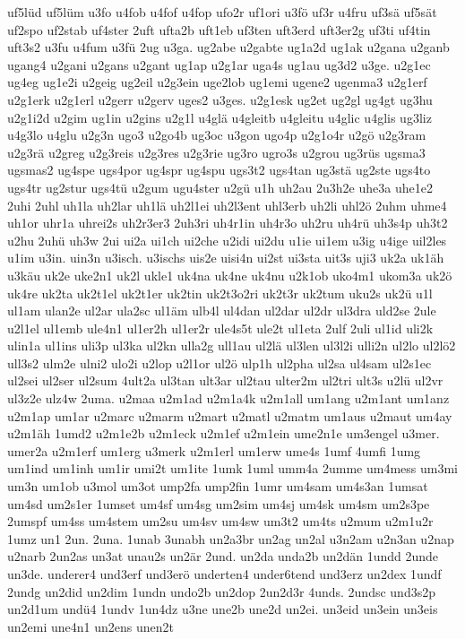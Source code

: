 {uf5lüd
uf5lüm
u3fo
u4fob
u4fof
u4fop
ufo2r
uf1ori
u3fö
uf3r
u4fru
uf3sä
uf5sät
uf2spo
uf2stab
uf4ster
2uft
ufta2b
uft1eb
uf3ten
uft3erd
uft3er2g
uf3ti
uf4tin
uft3s2
u3fu
u4fum
u3fü
2ug
u3ga.
ug2abe
u2gabte
ug1a2d
ug1ak
u2gana
u2ganb
ugang4
u2gani
u2gans
u2gant
ug1ap
u2g1ar
uga4s
ug1au
ug3d2
u3ge.
u2g1ec
ug4eg
ug1e2i
u2geig
ug2eil
u2g3ein
uge2lob
ug1emi
ugene2
ugenma3
u2g1erf
u2g1erk
u2g1erl
u2gerr
u2gerv
uges2
u3ges.
u2g1esk
ug2et
ug2gl
ug4gt
ug3hu
u2g1i2d
u2gim
ug1in
u2gins
u2g1l
u4glä
u4gleitb
u4gleitu
u4glic
u4glis
ug3liz
u4g3lo
u4glu
u2g3n
ugo3
u2go4b
ug3oc
u3gon
ugo4p
u2g1o4r
u2gö
u2g3ram
u2g3rä
u2greg
u2g3reis
u2g3res
u2g3rie
ug3ro
ugro3s
u2grou
ug3rüs
ugsma3
ugsmas2
ug4spe
ugs4por
ug4spr
ug4spu
ugs3t2
ugs4tan
ug3stä
ug2ste
ugs4to
ugs4tr
ug2stur
ugs4tü
u2gum
ugu4ster
u2gü
u1h
uh2au
2u3h2e
uhe3a
uhe1e2
2uhi
2uhl
uh1la
uh2lar
uh1lä
uh2l1ei
uh2l3ent
uhl3erb
uh2li
uhl2ö
2uhm
uhme4
uh1or
uhr1a
uhrei2s
uh2r3er3
2uh3ri
uh4r1in
uh4r3o
uh2ru
uh4rü
uh3s4p
uh3t2
u2hu
2uhü
uh3w
2ui
ui2a
ui1ch
ui2che
u2idi
ui2du
u1ie
ui1em
u3ig
u4ige
uil2les
u1im
u3in.
uin3n
u3isch.
u3ischs
uis2e
uisi4n
ui2st
ui3sta
uit3s
uji3
uk2a
uk1äh
u3käu
uk2e
uke2n1
uk2l
ukle1
uk4na
uk4ne
uk4nu
u2k1ob
uko4m1
ukom3a
uk2ö
uk4re
uk2ta
uk2t1el
uk2t1er
uk2tin
uk2t3o2ri
uk2t3r
uk2tum
uku2s
uk2ü
u1l
ul1am
ulan2e
ul2ar
ula2sc
ul1äm
ulb4l
ul4dan
ul2dar
ul2dr
ul3dra
uld2se
2ule
u2l1el
ul1emb
ule4n1
ul1er2h
ul1er2r
ule4s5t
ule2t
ul1eta
2ulf
2uli
ul1id
uli2k
ulin1a
ul1ins
uli3p
ul3ka
ul2kn
ulla2g
ull1au
ul2lä
ul3len
ul3l2i
ulli2n
ul2lo
ul2lö2
ull3s2
ulm2e
ulni2
ulo2i
u2lop
u2l1or
ul2ö
ulp1h
ul2pha
ul2sa
ul4sam
ul2s1ec
ul2sei
ul2ser
ul2sum
4ult2a
ul3tan
ult3ar
ul2tau
ulter2m
ul2tri
ult3s
u2lü
ul2vr
ul3z2e
ulz4w
2uma.
u2maa
u2m1ad
u2m1a4k
u2m1all
um1ang
u2m1ant
um1anz
u2m1ap
um1ar
u2marc
u2marm
u2mart
u2matl
u2matm
um1aus
u2maut
um4ay
u2m1äh
1umd2
u2m1e2b
u2m1eck
u2m1ef
u2m1ein
ume2n1e
um3engel
u3mer.
umer2a
u2m1erf
um1erg
u3merk
u2m1erl
um1erw
ume4s
1umf
4umfi
1umg
um1ind
um1inh
um1ir
umi2t
um1ite
1umk
1uml
umm4a
2umme
um4mess
um3mi
um3n
um1ob
u3mol
um3ot
ump2fa
ump2fin
1umr
um4sam
um4s3an
1umsat
um4sd
um2s1er
1umset
um4sf
um4sg
um2sim
um4sj
um4sk
um4sm
um2s3pe
2umspf
um4ss
um4stem
um2su
um4sv
um4sw
um3t2
um4ts
u2mum
u2m1u2r
1umz
un1
2un.
2una.
1unab
3unabh
un2a3br
un2ag
un2al
u3n2am
u2n3an
u2nap
u2narb
2un2as
un3at
unau2s
un2är
2und.
un2da
unda2b
un2dän
1undd
2unde
un3de.
underer4
und3erf
und3erö
underten4
under6tend
und3erz
un2dex
1undf
2undg
un2did
un2dim
1undn
undo2b
un2dop
2un2d3r
4unds.
2undsc
und3s2p
un2d1um
undü4
1undv
1un4dz
u3ne
une2b
une2d
un2ei.
un3eid
un3ein
un3eis
un2emi
une4n1
un2ens
unen2t
}
